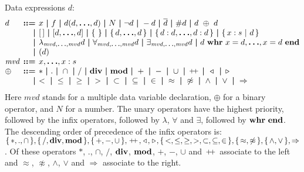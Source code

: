 \documentclass[a4paper,fleqn,10pt]{article}
\makeatletter
\newcommand{\f}[1]{\ensuremath{\mathit{#1}}}
\newenvironment{tightarray}[1]
  {\setlength{\arraycolsep}{2pt}%
   \begin{array}{@{}#1@{}}%
  }
  {\end{array}%
  }
\newcommand{\set}[1]{\ensuremath{\{\,#1\,\}}}
\newcommand{\scompr}[2]{\ensuremath{\set{#1\ |\ #2}}}
\newcommand{\el}{\ensuremath{[\,]}}
\newcommand{\cons}{\ensuremath{\hspace{0.12em}\triangleright\hspace{0.08em}}}
\newcommand{\snoc}{\ensuremath{\hspace{0.08em}\triangleleft\hspace{0.12em}}}
\newcommand{\concat}{\ensuremath{\hspace{0.12em}\raisebox{0.2ex}
{\text{\footnotesize+}\!\text{\footnotesize+}}\hspace{0.12em}}}
\newcommand{\limp}{\ensuremath{\Rightarrow}}
\newcommand{\mb}[1]{\text{\boldmath$#1$}}
\newcommand{\kwwhr}{{\bf whr}}
\newcommand{\kwend}{{\bf end}}
\newcommand{\kwdiv}{{\bf div}}
\newcommand{\kwmod}{{\bf mod}}
\makeatother
\begin{document}
Data expressions $d$:
\[\begin{tightarray}{lrl}
d      & \mb{::=} & x\ \mb{|}\ f\ \mb{|}\ d(d, \mb{\ldots}, d)\ \mb{|}\ N\ \mb{|}\ 
               \lnot d\ \mb{|}\ -d\ \mb{|}\ \overline{d}\ \mb{|}\ \#d\ \mb{|}\ d\ \oplus\ d\\
       & \mb{|} & \el\ \mb{|}\ [d,\mb{\ldots},d]\ \mb{|}\ \set{}\ \mb{|}\ \set{d,\mb{\ldots},d}\ \mb{|}\ 
               \set{d: d,\mb{\ldots},d: d}\ \mb{|}\ \scompr{x: s}{d}\\
       & \mb{|} & \lambda_{\f{mvd},\mb{\ldots},\f{mvd}} d\ \mb{|}\ 
               \forall_{\f{mvd},\mb{\ldots},\f{mvd}} d\ \mb{|}\ \exists_{\f{mvd},\mb{\ldots},\f{mvd}} d\ \mb{|}\ 
               d\ \kwwhr\ x=d,\mb{\ldots},x=d\ \kwend\\
        & \mb{|} & ( d )\\
\f{mvd}& \mb{::=} & x,\mb{\ldots},x: s\\
\oplus & \mb{::=} & *\ \mb{|}\ .\ \mb{|}\ \cap\ \mb{|}\ 
               /\ \mb{|}\  \kwdiv\ \mb{|}\ \kwmod\ \mb{|}\ 
               +\ \mb{|}\ -\ \mb{|}\ \cup\ \mb{|}\ 
               \concat\ \mb{|}\ 
               \snoc\ \mb{|}\ 
               \cons\\
       & \mb{|} &
               <\ \mb{|}\ \leq\ \mb{|}\ \geq\ \mb{|}\ >\ \mb{|}\ \subset\ \mb{|}\ \subseteq\ \mb{|}\ \in\ \mb{|}\ 
               \approx\ \mb{|}\ \not\approx\ \mb{|}\ 
               \land\ \mb{|}\ \lor\ \mb{|}\ 
               \limp
\end{tightarray}\]
Here $\f{mvd}$ stands for a multiple data variable declaration, $\oplus$ for a binary operator, and $N$ for a number.
The unary operators have the highest priority, followed by the infix operators,
followed by $\lambda$, $\forall$ and $\exists$, followed by $\kwwhr\ \kwend$.
The descending order of precedence of the infix operators is:
$\set{*, ., \cap}, \set{/, \kwdiv, \kwmod}, \set{+, -, \cup}, \concat, \snoc,
\cons, \set{<, \leq, \geq, >, \subset, \subseteq, \in}, \set{\approx,\not\approx},
\set{\land, \lor}, \limp$.
Of these operators $*$, $.$, $\cap$, $/$, $\kwdiv$, $\kwmod$, $+$, $-$, $\cup$ and
$\concat$ associate to the left and $\approx$, $\not\approx$, $\land$, $\lor$
and $\limp$ associate to the right.
\end{document}
